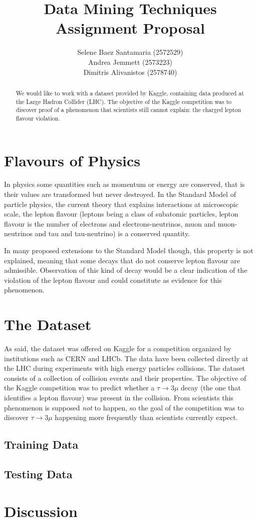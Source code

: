 \documentclass[11pt]{article}
\title{
	{\textbf{Data Mining Techniques} \\ Assignment Proposal}
}
\author{
\footnotesize{Selene Baez Santamaria (2572529)} \\
\footnotesize{Andrea Jemmett (2573223)} \\
\footnotesize{Dimitris Alivanistos (2578740)}
}
\begin{document}
\maketitle

\begin{abstract}
We would like to work with a dataset provided by Kaggle, containing data
produced at the Large Hadron Collider (LHC). The objective of the Kaggle
competition was to discover proof of a phenomenon that scientists still cannot
explain: the charged lepton flavour violation.
\end{abstract}

\section{Flavours of Physics}
In physics some quantities such as momentum or energy are conserved, that is
their values are transformed but never destroyed. In the Standard Model of
particle physics, the current theory that explains interactions at microscopic
scale, the lepton flavour (leptons being a class of subatomic particles, lepton
flavour is the number of electrons and electrons-neutrinos, muon and
muon-neutrinos and tau and tau-neutrino) is a conserved quantity.

In many proposed extensions to the Standard Model though, this property is not
explained, meaning that some decays that do not conserve lepton flavour are
admissible. Observation of this kind of decay would be a clear indication of the
violation of the lepton flavour and could constitute as evidence for this
phenomenon.

\section{The Dataset}
As said, the dataset was offered on Kaggle for a competition organized by
institutions such as CERN and LHCb. The data have been collected directly at the
LHC during experiments with high energy particles collisions. The dataset
consists of a collection of collision events and their properties. The objective
of the Kaggle competition was to predict whether a $\tau \rightarrow 3\mu$ decay
(the one that identifies a lepton flavour) was present in the collision. From
scientists this phenomenon is supposed \emph{not} to happen, so the goal of the
competition was to discover $\tau \rightarrow 3\mu$ happening more frequently
than scientists currently expect.

\subsection{Training Data}


\subsection{Testing Data}


\section{Discussion}
\end{document}
